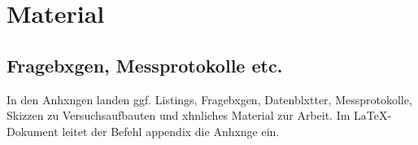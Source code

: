 \appendix
\chapter{Material}

\section{Fragebxgen, Messprotokolle etc.}
In den Anhxngen landen ggf. Listings, Fragebxgen, Datenblxtter, Messprotokolle, Skizzen zu Versuchsaufbauten und xhnliches Material zur Arbeit. Im \LaTeX-Dokument leitet der Befehl appendix die Anhxnge ein.




\listoffigures %
\listoftables %


 



\clearpage\thispagestyle{empty}
\eigen  %

